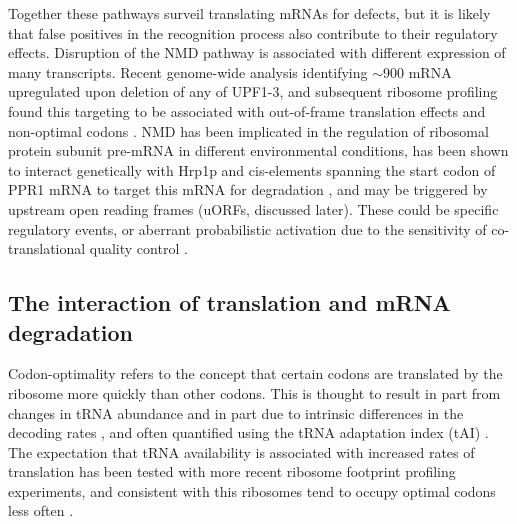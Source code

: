 
Together
these pathways surveil translating mRNAs for defects, but it is likely
that false positives in the recognition process also contribute to
their regulatory effects.  
Disruption of the NMD pathway is associated
with different expression of many transcripts. Recent genome-wide
analysis identifying $\sim$900 mRNA upregulated upon deletion of any of
UPF1-3, and subsequent ribosome profiling found this targeting to be
associated with out-of-frame translation effects and non-optimal
codons \parencite{celik2017high}.
NMD has been implicated in the regulation
of ribosomal protein subunit pre-mRNA 
\parencite{garre2013nonsense}
in different
environmental conditions, has been shown to interact genetically with
Hrp1p and cis-elements spanning the start codon of PPR1 mRNA to target
this mRNA for degradation 
\parencite{pierrat19935,kebaara2003upf},
and may be triggered by upstream open reading frames (uORFs, discussed
later). These could be specific regulatory events, 
or aberrant probabilistic
activation due to the sensitivity of co-translational quality control
\parencite{celik2017high}.


\subsection{The interaction of translation and mRNA
degradation}

Codon-optimality refers to the concept that certain codons
are translated by the ribosome more quickly than other codons. This is
thought to result in part from changes in tRNA abundance and in part
due to intrinsic differences in the decoding rates 
\parencite{curran1989rates,thomas1988codon}, and often quantified
using the tRNA adaptation index (tAI)
\parencite{reis2004solving}. The expectation that tRNA availability is
associated with increased rates of translation has been tested with
more recent ribosome footprint profiling experiments, and consistent
with this ribosomes tend to occupy optimal codons less often 
\parencite{weinberg2016improved}.  

